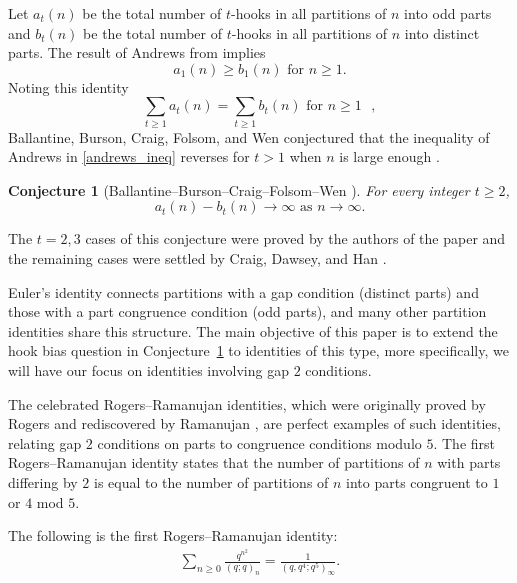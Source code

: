 \documentclass[11pt,reqno]{amsart}
\newtheorem{conjecture}[theorem]{Conjecture}
\theoremstyle{remark}
\numberwithin{equation}{section}
\begin{document}

Let $a_t(n)$ be the total number of  $t$-hooks  in all partitions of $n$ into odd parts and $b_t(n)$ be the total number of $t$-hooks in all partitions of $n$  into distinct parts. The result of Andrews from \cite[Theorem 2]{andrews2017} implies 
\begin{equation}\label{andrews_ineq}
a_1(n) \ge b_1(n) \text{ for $n\ge 1$}.
\end{equation}
Noting this identity 
\[
\sum_{t\ge 1} a_t(n) =\sum_{t\ge 1} b_t(n) \text{ for $n\ge 1$ },
\]
Ballantine, Burson, Craig, Folsom, and Wen conjectured that the inequality of Andrews in \eqref{andrews_ineq} reverses for $t>1$ when $n$ is large enough \cite{ballantine1}. 

\begin{conjecture}[Ballantine--Burson--Craig--Folsom--Wen \cite{ballantine1}] \label{conj1.1}
For every integer $t\ge 2$, 
\begin{equation}\label{conj1.1_ineq}
a_t(n) - b_t(n) \to \infty \text{ as } n \to \infty. 
\end{equation} 
\end{conjecture}

The $t=2,3$ cases of this conjecture were proved by the authors of the paper \cite{ballantine1} and the remaining cases were settled by Craig, Dawsey, and Han \cite{craig1}. 

Euler's identity connects partitions with a gap condition (distinct parts) and those with a part congruence condition (odd parts), and many other partition identities share this structure. The main objective of this paper is to extend the hook bias question in Conjecture~\ref{conj1.1} to identities of this type,  more specifically, we will have our focus on identities involving gap $2$ conditions. 

The celebrated Rogers–Ramanujan identities, which were originally proved by Rogers \cite{rogers} and rediscovered by Ramanujan \cite{ramanujan}, are perfect examples of such identities, relating gap $2$ conditions on parts to congruence conditions modulo $5$.  The first Rogers--Ramanujan identity states that the number of partitions of $n$ with parts differing by $2$ is equal to the number of partitions of $n$ into parts congruent to $1$ or $4$ mod $5$. 

\iffalse
The following is the first Rogers--Ramanujan identity:
\begin{align*}
	\sum_{n\ge 0} \frac{ q^{n^2}}{(q;q)_n} =\frac{1}{(q,q^4;q^{5})_{\infty}}.
\end{align*}   
\end{document}
